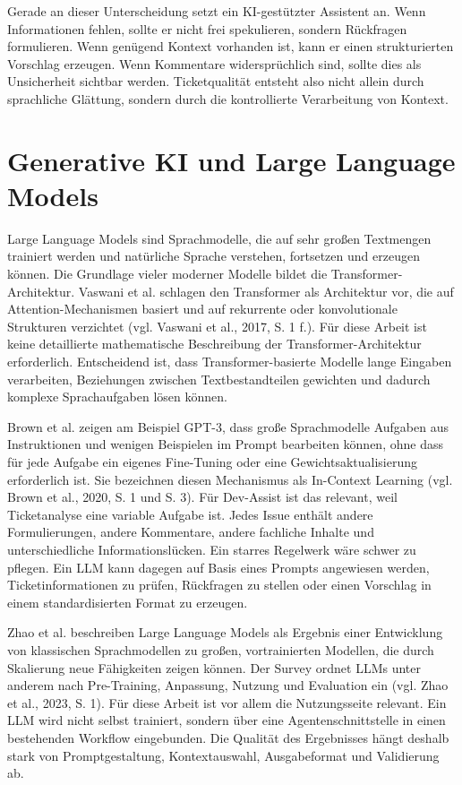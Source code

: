\documentclass[12pt,a4paper,oneside]{scrreprt}
\begin{document}
Gerade an dieser Unterscheidung setzt ein KI-gestützter Assistent an. Wenn Informationen fehlen, sollte er nicht frei spekulieren, sondern Rückfragen formulieren. Wenn genügend Kontext vorhanden ist, kann er einen strukturierten Vorschlag erzeugen. Wenn Kommentare widersprüchlich sind, sollte dies als Unsicherheit sichtbar werden. Ticketqualität entsteht also nicht allein durch sprachliche Glättung, sondern durch die kontrollierte Verarbeitung von Kontext.

\section{Generative KI und Large Language Models}

Large Language Models sind Sprachmodelle, die auf sehr großen Textmengen trainiert werden und natürliche Sprache verstehen, fortsetzen und erzeugen können. Die Grundlage vieler moderner Modelle bildet die Transformer-Architektur. Vaswani et al. schlagen den Transformer als Architektur vor, die auf Attention-Mechanismen basiert und auf rekurrente oder konvolutionale Strukturen verzichtet (vgl. Vaswani et al., 2017, S. 1 f.). Für diese Arbeit ist keine detaillierte mathematische Beschreibung der Transformer-Architektur erforderlich. Entscheidend ist, dass Transformer-basierte Modelle lange Eingaben verarbeiten, Beziehungen zwischen Textbestandteilen gewichten und dadurch komplexe Sprachaufgaben lösen können.

Brown et al. zeigen am Beispiel GPT-3, dass große Sprachmodelle Aufgaben aus Instruktionen und wenigen Beispielen im Prompt bearbeiten können, ohne dass für jede Aufgabe ein eigenes Fine-Tuning oder eine Gewichtsaktualisierung erforderlich ist. Sie bezeichnen diesen Mechanismus als In-Context Learning (vgl. Brown et al., 2020, S. 1 und S. 3). Für Dev-Assist ist das relevant, weil Ticketanalyse eine variable Aufgabe ist. Jedes Issue enthält andere Formulierungen, andere Kommentare, andere fachliche Inhalte und unterschiedliche Informationslücken. Ein starres Regelwerk wäre schwer zu pflegen. Ein LLM kann dagegen auf Basis eines Prompts angewiesen werden, Ticketinformationen zu prüfen, Rückfragen zu stellen oder einen Vorschlag in einem standardisierten Format zu erzeugen.

Zhao et al. beschreiben Large Language Models als Ergebnis einer Entwicklung von klassischen Sprachmodellen zu großen, vortrainierten Modellen, die durch Skalierung neue Fähigkeiten zeigen können. Der Survey ordnet LLMs unter anderem nach Pre-Training, Anpassung, Nutzung und Evaluation ein (vgl. Zhao et al., 2023, S. 1). Für diese Arbeit ist vor allem die Nutzungsseite relevant. Ein LLM wird nicht selbst trainiert, sondern über eine Agentenschnittstelle in einen bestehenden Workflow eingebunden. Die Qualität des Ergebnisses hängt deshalb stark von Promptgestaltung, Kontextauswahl, Ausgabeformat und Validierung ab.
\end{document}
